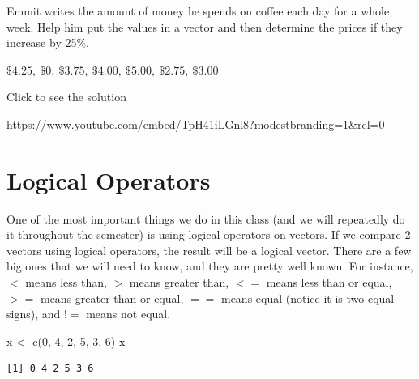 \documentclass[
  letterpaper,
  DIV=11,
  numbers=noendperiod]{scrreprt}
\newenvironment{Shaded}{\begin{snugshade}}{\end{snugshade}}
\newcommand{\DecValTok}[1]{\textcolor[rgb]{0.68,0.00,0.00}{#1}}
\newcommand{\FunctionTok}[1]{\textcolor[rgb]{0.28,0.35,0.67}{#1}}
\newcommand{\NormalTok}[1]{\textcolor[rgb]{0.00,0.23,0.31}{#1}}
\newcommand{\OtherTok}[1]{\textcolor[rgb]{0.00,0.23,0.31}{#1}}
\begin{document}
\begin{tcolorbox}[enhanced jigsaw, colbacktitle=quarto-callout-tip-color!10!white, breakable, bottomrule=.15mm, colframe=quarto-callout-tip-color-frame, left=2mm, opacitybacktitle=0.6, title=\textcolor{quarto-callout-tip-color}{\faLightbulb}\hspace{0.5em}{Try it Out}, leftrule=.75mm, opacityback=0, rightrule=.15mm, titlerule=0mm, bottomtitle=1mm, colback=white, toprule=.15mm, arc=.35mm, toptitle=1mm, coltitle=black]

Emmit writes the amount of money he spends on coffee each day for a
whole week. Help him put the values in a vector and then determine the
prices if they increase by 25\%.

\(\$4.25,\ \$0,\ \$3.75,\ \$4.00,\ \$5.00,\ \$2.75,\ \$3.00\)

Click to see the solution

\url{https://www.youtube.com/embed/TpH41iLGnl8?modestbranding=1&rel=0}

\end{tcolorbox}

\section{Logical Operators}\label{logical-operators}

One of the most important things we do in this class (and we will
repeatedly do it throughout the semester) is using logical operators on
vectors. If we compare 2 vectors using logical operators, the result
will be a logical vector. There are a few big ones that we will need to
know, and they are pretty well known. For instance, \(<\) means less
than, \(>\) means greater than, \(<=\) means less than or equal, \(>=\)
means greater than or equal, \(==\) means equal (notice it is two equal
signs), and \(!=\) means not equal.

\begin{Shaded}
\begin{Highlighting}[]
\NormalTok{x }\OtherTok{\textless{}{-}} \FunctionTok{c}\NormalTok{(}\DecValTok{0}\NormalTok{, }\DecValTok{4}\NormalTok{, }\DecValTok{2}\NormalTok{, }\DecValTok{5}\NormalTok{, }\DecValTok{3}\NormalTok{, }\DecValTok{6}\NormalTok{)}
\NormalTok{x}
\end{Highlighting}
\end{Shaded}

\begin{verbatim}
[1] 0 4 2 5 3 6
\end{verbatim}
\end{document}
